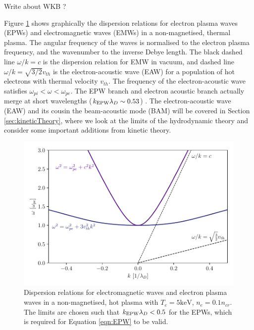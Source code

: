 Write about WKB ? 

Figure \ref{fig:EMW_EPW_disp} shows graphically the dispersion relations for electron plasma waves (\acrshort{EPW}s) and electromagnetic waves (\acrshort{EMW}s) in a non-magnetised, thermal plasma. The angular frequency of the waves is normalised to the electron plasma frequency, and the wavenumber to the inverse Debye length. The black dashed line $\omega / k = c$ is the dispersion relation for \acrshort{EMW} in vacuum, and dashed line $\omega / k = \sqrt{3/2}v_{th}$ is the electron-acoustic wave (\acrshort{EAW}) for a population of hot electrons with thermal velocity $v_{th}$. The frequency of the electron-acoustic wave satisfies $\omega_{pi} < \omega < \omega_{pe}$. The \acrshort{EPW} branch and electron acoustic branch actually merge at short wavelengths ($k_\mathrm{EPW}\lambda_D\sim 0.53$) \citep{Rose2003}. The electron-acoustic wave (\acrshort{EAW}) and its cousin the beam-acoustic mode (\acrshort{BAM}) will be covered in Section \ref{sec:kineticTheory}, where we look at the limits of the hydrodynamic theory and consider some important additions from kinetic theory.


\begin{figure}[ht]
   \centering
    \includegraphics[width=0.9\columnwidth]{Chapters/C2_Theory/EPW_EMW_dispersion.pdf}
    \caption{Dispersion relations for electromagnetic waves and electron plasma waves in a non-magnetised, hot plasma with $T_e= 5\text{keV}$, $n_e=0.1n_{cr}$. The limits are chosen such that $k_\mathrm{EPW}\lambda_D < 0.5$ for the \acrshort{EPW}s, which is required for Equation \ref{eqn:EPW} to be valid.}
    \label{fig:EMW_EPW_disp}
\end{figure}{}


